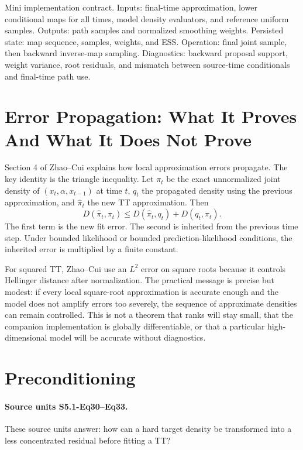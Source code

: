 \documentclass[11pt]{article}
\begin{document}
Mini implementation contract.  Inputs: final-time approximation, lower
conditional maps for all times, model density evaluators, and reference uniform
samples.  Outputs: path samples and normalized smoothing weights.  Persisted
state: map sequence, samples, weights, and ESS.  Operation: final joint sample,
then backward inverse-map sampling.  Diagnostics: backward proposal support,
weight variance, root residuals, and mismatch between source-time conditionals
and final-time path use.

\section{Error Propagation: What It Proves And What It Does Not Prove}

Section 4 of Zhao--Cui explains how local approximation errors propagate.  The
key identity is the triangle inequality.  Let \(\pi_t\) be the exact
unnormalized joint density of \((x_t,\alpha,x_{t-1})\) at time \(t\), \(q_t\)
the propagated density using the previous approximation, and
\(\widehat\pi_t\) the new TT approximation.  Then
\[
    D(\widehat\pi_t,\pi_t)
    \le
    D(\widehat\pi_t,q_t)+D(q_t,\pi_t).
    \tag{E1}
\]
The first term is the new fit error.  The second is inherited from the previous
time step.  Under bounded likelihood or bounded prediction-likelihood
conditions, the inherited error is multiplied by a finite constant.

For squared TT, Zhao--Cui use an \(L^2\) error on square roots because it
controls Hellinger distance after normalization.  The practical message is
precise but modest: if every local square-root approximation is accurate enough
and the model does not amplify errors too severely, the sequence of approximate
densities can remain controlled.  This is not a theorem that ranks will stay
small, that the companion implementation is globally differentiable, or that a
particular high-dimensional model will be accurate without diagnostics.

\section{Preconditioning}

\paragraph{Source units S5.1-Eq30--Eq33.}
These source units answer: how can a hard target density be transformed into a
less concentrated residual before fitting a TT?
\end{document}

